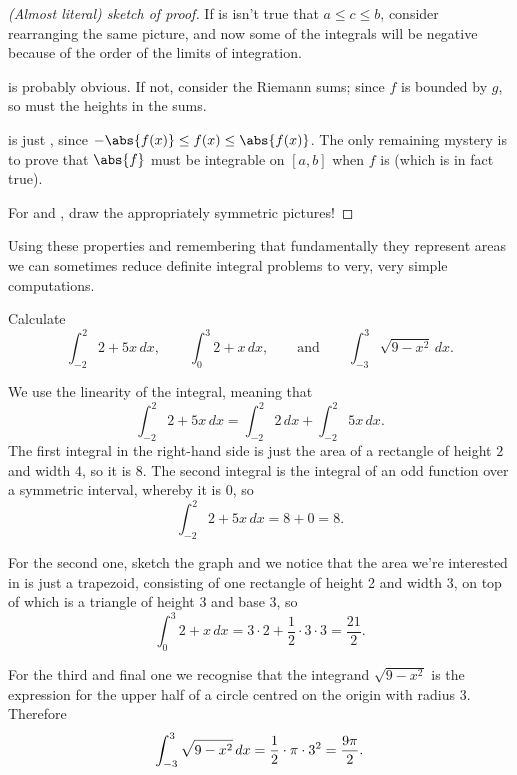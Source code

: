 \begin{proof}[(Almost literal) sketch of proof]
	\noindent
	If is isn't true that $a \leq c \leq b$, consider rearranging the same picture, and now some of the integrals will be negative because of the order of the limits of integration.

	 is probably obvious. If not, consider the Riemann sums; since $f$ is bounded by $g$, so must the heights in the sums.

	 is just , since $-\abs{f(x)} \leq f(x) \leq \abs{f(x)}$. The only remaining mystery is to prove that $\abs{f}$ must be integrable on $[a, b]$ when $f$ is (which is in fact true).

	For  and , draw the appropriately symmetric pictures!
\end{proof}

\noindent
Using these properties and remembering that fundamentally they represent areas we can sometimes reduce definite integral problems to very, very simple computations.

\begin{examples}
	Calculate
	\[
		\int_{-2}^2 2 + 5 x \, d x, \qquad \int_0^3 2 + x \, d x, \qquad \text{and} \qquad \int_{-3}^3 \sqrt{9 - x^2} \, d x.
	\]

	\noindent
	We use the linearity of the integral, meaning that
	\[
		\int_{-2}^2 2 + 5 x \, d x = \int_{-2}^2 2 \, d x + \int_{-2}^2 5 x \, d x.
	\]
	The first integral in the right-hand side is just the area of a rectangle of height $2$ and width $4$, so it is $8$. The second integral is the integral of an odd function over a symmetric interval, whereby it is $0$, so
	\[
		\int_{-2}^2 2 + 5 x \, d x = 8 + 0 = 8.
	\]

	\noindent
	For the second one, sketch the graph and we notice that the area we're interested in is just a trapezoid, consisting of one rectangle of height 2 and width 3, on top of which is a triangle of height 3 and base 3, so
	\[
		\int_0^3 2 + x \, d x = 3 \cdot 2 + \frac{1}{2} \cdot 3 \cdot 3 = \frac{21}{2}.
	\]

	\noindent
	For the third and final one we recognise that the integrand $\sqrt{9 - x^2}$ is the expression for the upper half of a circle centred on the origin with radius 3. Therefore
	\[
		\int_{-3}^3 \sqrt{9 - x^2} \, d x = \frac{1}{2} \cdot \pi \cdot 3^2 = \frac{9 \pi}{2}. \qedhere
	\]
\end{examples}
